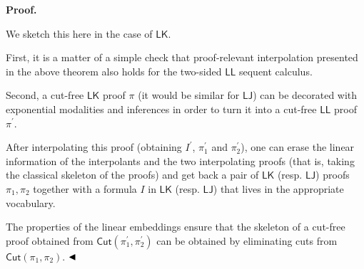  
 
 
\par\medskip\noindent\textbf{Proof.}\par
 
 
We sketch this here in the case of $\mathsf{LK}$.\par
 
 
 
First, it is a matter of a simple check that proof-relevant interpolation presented in the above theorem also holds for the two-sided $\mathsf{LL}$ sequent calculus.\par
 
 
 
Second, a cut-free $\mathsf{LK}$ proof $\pi$ (it would be similar for $\mathsf{LJ}$) can be decorated with exponential modalities and inferences in order to turn it into a cut-free $\mathsf{LL}$ proof $\pi^{\prime}$.\par
 
 
 
After interpolating this proof (obtaining $I^{\prime}$, $\pi^{\prime}_{1}$ and $\pi^{\prime}_{2}$), one can erase the linear information of the interpolants and the two interpolating proofs (that is, taking the classical skeleton of the proofs) and get back a pair of $\mathsf{LK}$ (resp. $\mathsf{LJ}$) proofs $\pi_{1},\pi_{2}$ together with a formula $I$ in $\mathsf{LK}$ (resp. $\mathsf{LJ}$) that lives in the appropriate vocabulary.\par
 
 
 
The properties of the linear embeddings ensure that the skeleton of a cut-free proof obtained from $\mathsf{Cut}(\pi^{\prime}_{1},\pi^{\prime}_{2})$ can be obtained by eliminating cuts from $\mathsf{Cut}(\pi_{1},\pi_{2})$. $\hfill\blacktriangleleft$\par
 
 

